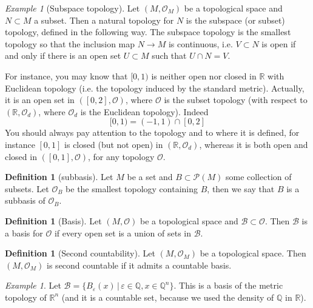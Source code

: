 \documentclass[a4paper,11pt,titlepage]{article}
\numberwithin{equation}{section}
\theoremstyle{definition}
\newtheorem{definition}[theorem]{Definition}
\theoremstyle{remark}
\newtheorem{example}[theorem]{Example}
\newcommand{\rfield}{\mathbb{R}}
\begin{document}
\begin{example}[Subspace topology]
Let $(M, \mathcal{O}_M)$ be a topological space and $N \subset M$ a subset. Then a natural topology for $N$ is the subspace (or subset) topology, defined in the following way. The subspace topology is the smallest topology so that the inclusion map $N \rightarrow M$ is continuous, i.e. $V \subset N$ is open if and only if there is an open set $U \subset M$ such that $U \cap N = V$. 

For instance, you may know that $[0, 1)$ is neither open nor closed in $\rfield$ with Euclidean topology (i.e. the topology induced by the standard metric). Actually, it is an open set in $([0, 2], \mathcal{O})$, where $\mathcal{O}$ is the subset topology (with respect to $(\rfield, \mathcal{O}_d)$, where $\mathcal{O}_d$ is the Euclidean topology). Indeed $$[0, 1) = (-1, 1) \cap [0, 2] $$
You should always pay attention to the topology and to where it is defined, for instance $[0, 1]$ is closed (but not open) in $(\rfield, \mathcal{O}_d)$, whereas it is both open and closed in $([0, 1], \mathcal{O})$, for any topology $\mathcal{O}$.
\end{example}

\begin{definition}[subbasis]
Let $M$ be a set and $B \subset \mathcal{P}(M)$ some collection of subsets. Let $\mathcal{O}_B$ be the smallest topology containing $B$, then we say that $B$ is a subbasis of $\mathcal{O}_B$.
\end{definition}

\begin{definition}[Basis]
Let $(M, \mathcal{O})$ be a topological space and $\mathcal{B} \subset \mathcal{O}$. Then $\mathcal{B}$ is a basis for $\mathcal{O}$ if every open set is a union of sets in $\mathcal{B}$.
\end{definition}

\begin{definition}[Second countability]
Let $(M, \mathcal{O}_M)$ be a topological space. Then $(M, \mathcal{O}_M)$ is second countable if it admits a countable basis.
\end{definition}

\begin{example}
Let $\mathcal{B} = \{B_{\varepsilon}(x) \, | \, \varepsilon \in \mathbb{Q}, x \in \mathbb{Q}^n \}$. This is a basis of the metric topology of $\rfield^n$ (and it is a countable set, because we used the density of $\mathbb{Q}$ in $\rfield$). 
\end{example}
\end{document}
